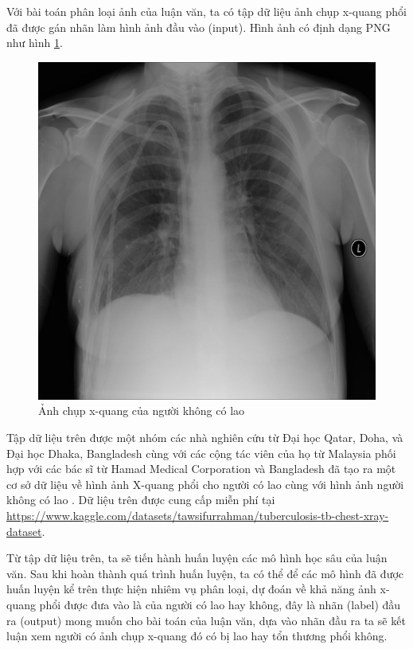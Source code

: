 Với bài toán phân loại ảnh của luận văn, ta có tập dữ liệu ảnh chụp x-quang phổi đã được gán nhãn làm hình ảnh đầu vào (input). Hình ảnh có định dạng PNG như hình \ref{fig:normalimg}.
\begin{figure}[H]
	\centering
	\includegraphics[width=0.55\linewidth]{images/Normal-1.png}
	\caption{Ảnh chụp x-quang của người không có lao}
	\label{fig:normalimg}
\end{figure}
Tập dữ liệu trên được một nhóm các nhà nghiên cứu từ Đại học Qatar, Doha, và Đại học Dhaka, Bangladesh cùng với các cộng tác viên của họ từ Malaysia phối hợp với các bác sĩ từ Hamad Medical Corporation và Bangladesh đã tạo ra một cơ sở dữ liệu về hình ảnh X-quang phổi cho người có lao cùng với hình ảnh người không có lao \cite{dataset}. Dữ liệu trên được cung cấp miễn phí tại \href{https://www.kaggle.com/datasets/tawsifurrahman/tuberculosis-tb-chest-xray-dataset}{https://www.kaggle.com/datasets/tawsifurrahman/tuberculosis-tb-chest-xray-dataset}.

Từ tập dữ liệu trên, ta sẽ tiến hành huấn luyện các mô hình học sâu của luận văn. Sau khi hoàn thành quá trình huấn luyện, ta có thể để các mô hình đã được huấn luyện kể trên thực hiện nhiêm vụ phân loại, dự đoán về khả năng ảnh x-quang phổi được đưa vào là của người có lao hay không, đây là nhãn (label) đầu ra (output) mong muốn cho bài toán của luận văn, dựa vào nhãn đầu ra ta sẽ kết luận xem người có ảnh chụp x-quang đó có bị lao hay tổn thương phổi không. 